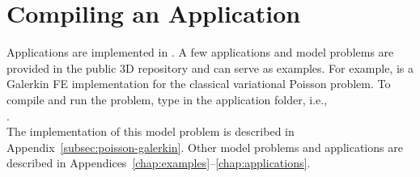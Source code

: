 \section{Compiling an Application}
\label{sec:application}

Applications are implemented in . A few applications and model problems are provided in the public \hp3D repository and can serve as examples. For example,  is a Galerkin FE implementation for the classical variational Poisson problem. To compile and run the problem, type  in the application folder, i.e.,\\
.\\
The implementation of this model problem is described in Appendix~\ref{subsec:poisson-galerkin}. Other model problems and applications are described in Appendices~\ref{chap:examples}--\ref{chap:applications}.

%


